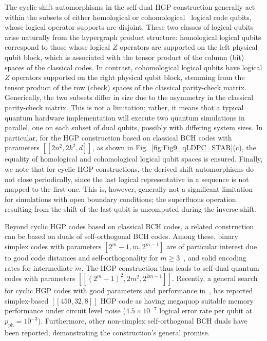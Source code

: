 \documentclass[aps, prx, reprint, superscriptaddress, longbibliography, floatfix]{revtex4-2}
\begin{document}
The cyclic shift automorphisms in the self-dual HGP construction generally act within the subsets of either homological or cohomological~\cite{Breuckmann2021} logical code qubits, whose logical operator supports are disjoint. These two classes of logical qubits arise naturally from the hypergraph product structure: homological logical qubits correspond to those whose logical $Z$ operators are supported on the left physical qubit block, which is associated with the tensor product of the column (bit) spaces of the classical codes. In contrast, cohomological logical qubits have logical $Z$ operators supported on the right physical qubit block, stemming from the tensor product of the row (check) spaces of the classical parity-check matrix. Generically, the two subsets differ in size due to the asymmetry in the classical parity-check matrix. This is not a limitation; rather, it means that a typical quantum hardware implementation will execute two quantum simulations in parallel, one on each subset of dual qubits, possibly with differing system sizes. In particular, for the HGP construction based on classical BCH codes with parameters $[[2n^2,2k^2,d]]$, as shown in Fig.~\ref{fig:Fig9_qLDPC_STAR}(c), the equality of homological and cohomological logical qubit spaces is ensured. Finally, we note that for cyclic HGP constructions, the derived shift automorphisms do not close periodically, since the last logical representative in a sequence is not mapped to the first one. This is, however, generally not a significant limitation for simulations with open boundary conditions; the superfluous operation resulting from the shift of the last qubit is uncomputed during the inverse shift. 

Beyond cyclic HGP codes based on classical BCH codes, a related construction can be based on duals of self-orthogonal BCH codes. Among these, binary simplex codes with parameters $[2^{m}-1, m, 2^{m-1}]$ are of particular interest due to good code distances and self-orthogonality for $m \geq 3$~\cite{Macwilliams1977}, and solid encoding rates for intermediate $m$. The HGP construction thus leads to self-dual quantum codes with parameters $[[(2^{m}-1)^2, 2m^2, 2^{2m-1}]]$. Recently, a general search for cyclic HGP codes with good parameters and performance in~\cite{Aydin2025}, has reported simplex-based $[[450,32,8]]$ HGP code as having megaquop suitable memory performance under circuit level noise ($4.5 \times 10^{-7}$ logical error rate per qubit at $p_{\mathrm{ph}}=10^{-3}$). Furthermore, other non-simplex self-orthogonal BCH duals have been reported, demonstrating the construction's general promise.
\end{document}
